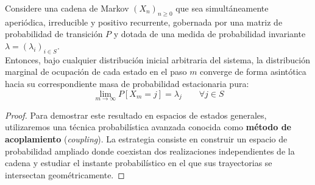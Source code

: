\begin{teo}
    Considere una cadena de Markov $(X_n)_{n \geq 0}$ que sea simultáneamente aperiódica, irreducible y positivo recurrente, gobernada por una matriz de probabilidad de transición $P$ y dotada de una medida de probabilidad invariante $\lambda = (\lambda_i)_{i \in S}$. \\

    \noindent
    Entonces, bajo cualquier distribución inicial arbitraria del sistema, la distribución marginal de ocupación de cada estado en el paso $m$ converge de forma asintótica hacia su correspondiente masa de probabilidad estacionaria pura:
    \[ 
    \lim_{m \to \infty} P[X_m = j] = \lambda_j \qquad \forall j \in S 
    \]
\begin{proof}
Para demostrar este resultado en espacios de estados generales, utilizaremos una técnica probabilística avanzada conocida como \textbf{método de acoplamiento} (\textit{coupling}). La estrategia consiste en construir un espacio de probabilidad ampliado donde coexistan dos realizaciones independientes de la cadena y estudiar el instante probabilístico en el que sus trayectorias se intersectan geométricamente.


\end{proof}
\end{teo}
